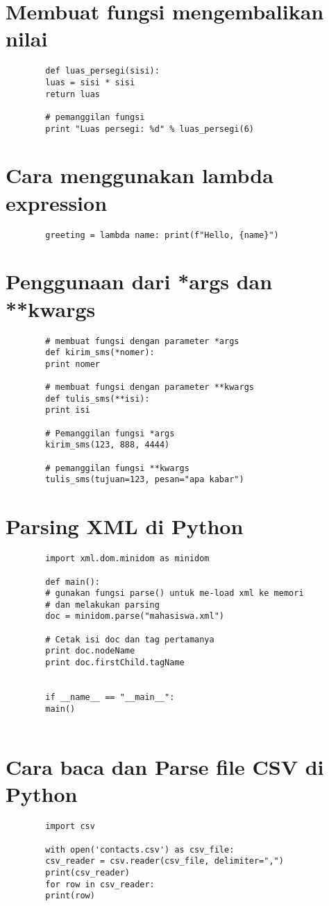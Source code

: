 \documentclass{article}
\begin{document}
	\section{Membuat fungsi mengembalikan nilai}
	\begin{lstlisting}
		def luas_persegi(sisi):
		luas = sisi * sisi
		return luas
		
		# pemanggilan fungsi
		print "Luas persegi: %d" % luas_persegi(6)
	\end{lstlisting}
	
	\section{Cara menggunakan lambda expression}
	\begin{lstlisting}
		greeting = lambda name: print(f"Hello, {name}") 
	\end{lstlisting}
	
	\section{Penggunaan dari *args dan **kwargs}
	\begin{lstlisting}
		# membuat fungsi dengan parameter *args
		def kirim_sms(*nomer):
		print nomer
		
		# membuat fungsi dengan parameter **kwargs
		def tulis_sms(**isi):
		print isi
		
		# Pemanggilan fungsi *args
		kirim_sms(123, 888, 4444)
		
		# pemanggilan fungsi **kwargs
		tulis_sms(tujuan=123, pesan="apa kabar")
	\end{lstlisting}
	
	\section{Parsing XML di Python}
	\begin{lstlisting}
		import xml.dom.minidom as minidom
		
		def main():
		# gunakan fungsi parse() untuk me-load xml ke memori 
		# dan melakukan parsing
		doc = minidom.parse("mahasiswa.xml")
		
		# Cetak isi doc dan tag pertamanya
		print doc.nodeName
		print doc.firstChild.tagName
		
		
		if __name__ == "__main__":
		main()
		
	\end{lstlisting}
	
	\section{Cara baca dan Parse file CSV di Python}
	\begin{lstlisting}
		import csv
		
		with open('contacts.csv') as csv_file:
		csv_reader = csv.reader(csv_file, delimiter=",")
		print(csv_reader)
		for row in csv_reader:
		print(row)
	\end{lstlisting}
	
\end{document}

